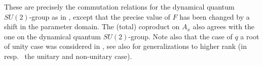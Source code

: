 \documentclass[10pt]{article}
\theoremstyle{definition}
\numberwithin{equation}{section}
\begin{document}
These are precisely the commutation relations for the dynamical quantum $SU(2)$-group as in \cite[Definition 2.6]{KoR1}, except that the precise value of $F$ has been changed by a shift in the parameter domain. The (total) coproduct on $A_x$ also agrees with the one on the dynamical quantum $SU(2)$-group. Note also that the case of $q$ a root of unity case was considered in \cite[Section 5]{Hay7}, see also \cite{Hay4, EtN1} for generalizations to higher rank (in resp.~ the unitary and non-unitary case).




%
%

\end{document}
